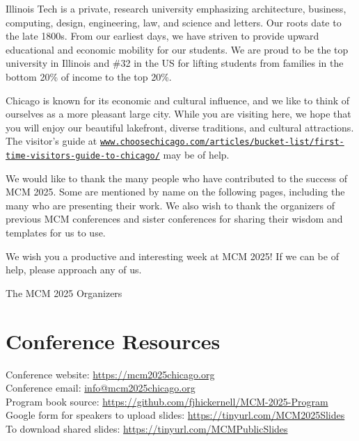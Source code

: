 Illinois Tech is a private, research university emphasizing architecture, business, computing, design, engineering, law, and science and letters.  Our roots date to the late 1800s.  From our earliest days, we have striven to provide upward educational and economic mobility for our students.  We are proud to be the top university in Illinois and \#32 in the US for lifting students from families in the bottom 20\% of income to the top 20\%.

Chicago is known for its economic and cultural influence, and we like to think of ourselves as a more pleasant large city.
While you are visiting here, we hope that you will enjoy our beautiful lakefront, diverse traditions, and cultural attractions. The visitor's guide at \href{https://www.choosechicago.com/articles/bucket-list/first-time-visitors-guide-to-chicago/}{\nolinkurl{www.choosechicago.com/articles/bucket-list/first-time-visitors-guide-to-chicago/}} may be of help.

We would like to thank the many people who have contributed to the success of MCM 2025.  Some are mentioned by name on the following pages, including the many who are presenting their work.  We also wish to thank the organizers of previous MCM conferences and sister conferences for sharing their wisdom and templates for us to use.

We wish you a productive and interesting week at MCM 2025! If we can be of help, please approach any of us.


\vspace{1.5ex}

The MCM 2025 Organizers

\vspace{0.2ex}





\section{Conference Resources} 
Conference website: \url{https://mcm2025chicago.org} \\
Conference email: \url{info@mcm2025chicago.org} \\
Program book source: \url{https://github.com/fjhickernell/MCM-2025-Program} \\
Google form for speakers to upload slides: \url{https://tinyurl.com/MCM2025Slides} \\
To download shared slides: \url{https://tinyurl.com/MCMPublicSlides}

